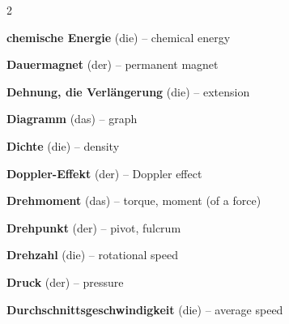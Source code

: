 \begin{multicols}{2}
\par\nopagebreak
\textbf{chemische Energie} (die) -- chemical energy\dotfill\hyperref[e:102]{\pageref*{e:102}}\par

\par\nopagebreak
\textbf{Dauermagnet} (der) -- permanent magnet\dotfill\hyperref[e:175]{\pageref*{e:175}}\par
\textbf{Dehnung, die Verlängerung} (die) -- extension\dotfill\hyperref[e:71]{\pageref*{e:71}}\par
\textbf{Diagramm} (das) -- graph\dotfill\hyperref[e:23]{\pageref*{e:23}}\par
\textbf{Dichte} (die) -- density\dotfill\hyperref[e:58]{\pageref*{e:58}}\par
\textbf{Doppler-Effekt} (der) -- Doppler effect\dotfill\hyperref[e:219]{\pageref*{e:219}}\par
\textbf{Drehmoment} (das) -- torque, moment (of a force)\dotfill\hyperref[e:81]{\pageref*{e:81}}\par
\textbf{Drehpunkt} (der) -- pivot, fulcrum\dotfill\hyperref[e:84]{\pageref*{e:84}}\par
\textbf{Drehzahl} (die) -- rotational speed\dotfill\hyperref[e:53]{\pageref*{e:53}}\par
\textbf{Druck} (der) -- pressure\dotfill\hyperref[e:89]{\pageref*{e:89}}\par
\textbf{Durchschnittsgeschwindigkeit} (die) -- average speed\dotfill\hyperref[e:38]{\pageref*{e:38}}\par


\end{multicols}
